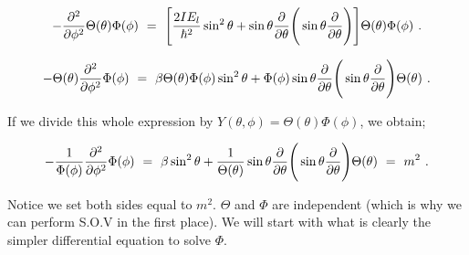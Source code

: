 \documentclass{article}
\begin{document}
\begin{equation} \label{eq:256}
-\frac{\partial^{2}}{\partial{\phi^{2}}} \Theta(\theta) \Phi(\phi) \hspace{0.125cm} = \hspace{0.125cm} \Bigg[ \frac{2 I E_l}{\hbar^{2}} \sin^{2} \theta + \sin\theta\frac{\partial}{\partial{\theta}}\Bigg(\sin\theta \frac{\partial}{\partial{\theta}}\Bigg) \Bigg] \Theta(\theta) \Phi(\phi) \hspace{0.125cm}. 
\end{equation}

\begin{equation} \label{eq:256}
- \Theta(\theta) \frac{\partial^{2}}{\partial{\phi^{2}}} \Phi(\phi) \hspace{0.125cm} = \hspace{0.125cm} \beta \Theta(\theta) \Phi(\phi) \sin^{2} \theta + \Phi(\phi) \sin\theta \frac{\partial}{\partial{\theta}}\Bigg(\sin\theta \frac{\partial}{\partial{\theta}}\Bigg) \Theta(\theta)  \hspace{0.125cm}. 
\end{equation}

If we divide this whole expression by \begin{math} Y(\theta,\phi) = \Theta(\theta) \Phi(\phi) \end{math}, we obtain;

\begin{equation} \label{eq:256}
- \frac{1}{\Phi(\phi)} \frac{\partial^{2}}{\partial{\phi^{2}}} \Phi(\phi) \hspace{0.125cm} = \hspace{0.125cm} \beta \sin^{2}\theta + \frac{1}{\Theta(\theta)} \sin\theta \frac{\partial}{\partial{\theta}}\Bigg(\sin\theta \frac{\partial}{\partial{\theta}}\Bigg) \Theta(\theta) \hspace{0.125cm} = \hspace{0.125cm} m^2 \hspace{0.125cm}. 
\end{equation}

Notice we set both sides equal to \begin{math} m^2 \end{math}.  \begin{math} \Theta \end{math} and \begin{math} \Phi \end{math} are independent (which is why we can perform S.O.V in the first place). We will start with what is clearly the simpler differential equation to solve \begin{math} \Phi \end{math}. 
\end{document}
